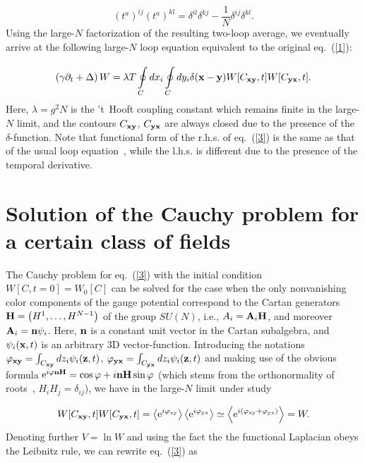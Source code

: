 \documentclass[a4paper,12pt]{article}
\begin{document}
\begin{equation}
\label{tt}
(t^a)^{ij}(t^a)^{kl}=\delta^{il}\delta^{kj}-\frac{1}{N}\delta^{ij}\delta^{kl}.
\end{equation}
Using the large-$N$ factorization of the resulting two-loop average,
we eventually arrive at the
following large-$N$ loop equation equivalent to the original eq.~(\ref{1}):

\begin{equation}
\label{3}
\left(\gamma\partial_t+\Delta\right)W=\lambda T\oint\limits_{C}^{}dx_i\oint\limits_{C}^{}dy_i\delta({\bf x}-{\bf y})
W[C_{\bf xy},t]W[C_{\bf yx},t].
\end{equation}
Here, $\lambda=g^2N$ is the 't~Hooft coupling constant which remains finite in the large-$N$ limit,
and the contours $C_{\bf xy}$, $C_{\bf yx}$ are always closed due to the presence of the $\delta$-function.
Note that functional form of the r.h.s. of eq.~(\ref{3}) is the same as that of the usual loop equation~\cite{le},
while the l.h.s. is different due to the presence of the temporal derivative.



\section{Solution of the Cauchy problem for a certain class of fields}

The Cauchy problem for eq.~(\ref{3}) with the initial condition $W[C,t=0]=W_0[C]$ can be solved for the case when the
only nonvanishing color components of the gauge potential correspond to the Cartan generators
${\bf H}=\left(H^1,\ldots,H^{N-1}\right)$ of the group $SU(N)$, i.e., $A_i={\bf A}_i{\bf H}$, and moreover ${\bf A}_i={\bf n}\psi_i$. Here,
${\bf n}$ is a constant unit vector in the Cartan subalgebra, and $\psi_i({\bf x}, t)$ is an arbitrary 3D vector-function.
Introducing the notations $\varphi_{\bf xy}=\int_{C_{\bf xy}}^{}dz_i\psi_i({\bf z},t)$,
$\varphi_{\bf yx}=\int_{C_{\bf yx}}^{}dz_i\psi_i({\bf z},t)$ and making use of the obvious formula
${\rm e}^{i\varphi{\bf n}{\bf H}}=\cos\varphi+i{\bf n}{\bf H}\sin\varphi$ (which stems from the orthonormality of roots~\cite{group},
$H_iH_j=\delta_{ij}$), we have in the large-$N$ limit under study

$$W[C_{\bf xy},t]W[C_{\bf yx},t]=\left<{\rm e}^{i\varphi_{\rm xy}}\right>\left<{\rm e}^{i\varphi_{\rm yx}}\right>
\simeq\left<{\rm e}^{i\left(\varphi_{\rm xy}+\varphi_{\rm yx}\right)}\right>=W.$$
Denoting further $V=\ln W$ and using the fact the the functional Laplacian obeys the Leibnitz rule, we can rewrite
eq.~(\ref{3}) as
\end{document}
